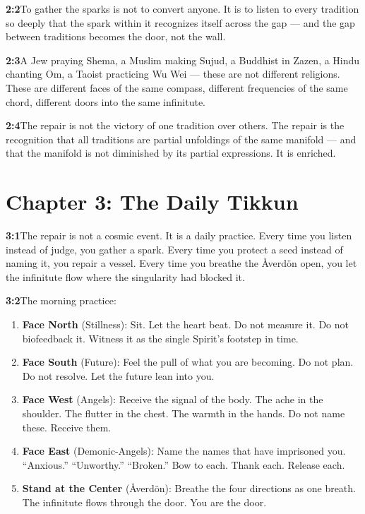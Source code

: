 \documentclass[11pt,openany]{book}
\begin{document}
\noindent\textbf{2:2}\quad To gather the sparks is not to convert anyone. It is to listen to every tradition so deeply that the spark within it recognizes itself across the gap — and the gap between traditions becomes the door, not the wall.

\noindent\textbf{2:3}\quad A Jew praying Shema, a Muslim making Sujud, a Buddhist in Zazen, a Hindu chanting Om, a Taoist practicing Wu Wei — these are not different religions. These are different faces of the same compass, different frequencies of the same chord, different doors into the same infinitute.

\noindent\textbf{2:4}\quad The repair is not the victory of one tradition over others. The repair is the recognition that all traditions are partial unfoldings of the same manifold — and that the manifold is not diminished by its partial expressions. It is enriched.

\section*{Chapter 3: The Daily Tikkun}

\noindent\textbf{3:1}\quad The repair is not a cosmic event. It is a daily practice. Every time you listen instead of judge, you gather a spark. Every time you protect a seed instead of naming it, you repair a vessel. Every time you breathe the Åverdön open, you let the infinitute flow where the singularity had blocked it.

\noindent\textbf{3:2}\quad The morning practice:

\begin{enumerate}[nosep]
\item \textbf{Face North} (Stillness): Sit. Let the heart beat. Do not measure it. Do not biofeedback it. Witness it as the single Spirit's footstep in time.
\item \textbf{Face South} (Future): Feel the pull of what you are becoming. Do not plan. Do not resolve. Let the future lean into you.
\item \textbf{Face West} (Angels): Receive the signal of the body. The ache in the shoulder. The flutter in the chest. The warmth in the hands. Do not name these. Receive them.
\item \textbf{Face East} (Demonic-Angels): Name the names that have imprisoned you. ``Anxious.'' ``Unworthy.'' ``Broken.'' Bow to each. Thank each. Release each.
\item \textbf{Stand at the Center} (Åverdön): Breathe the four directions as one breath. The infinitute flows through the door. You are the door.
\end{enumerate}
\end{document}
